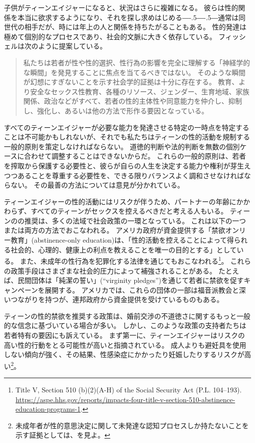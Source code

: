 \documentclass[paper=a4,book,openany]{jlreq}
\def\DDASH{―\kern-.5\zw―\kern-.5\zw―}
\begin{document}
子供がティーンエイジャーになると、状況はさらに複雑になる。
彼らは性的関係を本当に欲求するようになり、それを探し求めはじめる{\DDASH}通常は同世代の相手だが、時には年上の人と関係を持ちたがることもある。
性的発達は極めて個別的なプロセスであり、社会的文脈に大きく依存している。
フィッシェルは次のように提案している。

\begin{quote}
私たちは若者が性や性的選択、性行為の影響を完全に理解する「神経学的な瞬間」を発見することに焦点を当てるべきではない。
そのような瞬間が幻想にすぎないことを示す社会学的証拠は十分に存在する。
教育、より安全なセックス性教育、各種のリソース、ジェンダー、生育地域、家族関係、政治などがすべて、若者の性的主体性や同意能力を仲介し、抑制し、強化し、あるいは他の方法で形作る要因となっている。
\citep[p.305]{fischel10:_per_se_power}
\end{quote}

すべてのティーンエイジャーが必要な能力を発達させる特定の一時点を特定することは不可能かもしれないが、それでも私たちはティーンの性的活動を規制する一般的原則を策定しなければならない。
道徳的判断や法的判断を無数の個別ケースに合わせて調整することはできないからだ。
これらの一般的原則は、若者を搾取から保護する必要性と、彼らが自らの人生を決定する能力や権利が芽生えつつあることを尊重する必要性を、できる限りバランスよく調和させなければならない。
その最善の方法については意見が分かれている。

ティーンエイジャーの性的活動にはリスクが伴うため、パートナーの年齢にかかわらず、すべてのティーンがセックスを控えるべきだと考える人もいる。
ティーンのの推奨は、多くの法域で社会政策の一環となっている。
これは以下の一つまたは両方の方法でおこなわれる。
アメリカ政府が資金提供する「禁欲オンリー教育」(abstinence-only education)は、「性的活動を控えることによって得られる社会的、心理的、健康上の利点を教えることを唯一の目的とする」としている。
また、未成年の性行為を犯罪化する法律を通じてもおこなわれる\footnote{Title V, Section 510 (b)(2)(A-H) of the Social Security Act (P.L. 104--193). \url{https://aspe.hhs.gov/reports/impacts-four-title-v-section-510-abstinence-education-programs-1}.}。
これらの政策手段はさまざまな社会的圧力によって補強されることがある。
たとえば、民間団体は「純潔の誓い」(``virginity pledges'')を通じて若者に禁欲を促すキャンペーンを展開する。
アメリカでは、これらの団体の一部は福音派教会と深いつながりを持つが、連邦政府から資金提供を受けているものもある。

ティーンの性的禁欲を推奨する政策は、婚前交渉の不道徳さに関するもっと一般的な信念に基づいている場合が多い。
しかし、このような政策の支持者たちは若者特有の要因にも訴えている。
まず第一に、ティーンエイジャーはリスクの高い性的行動をとる可能性が高いと指摘されている。
成人よりも避妊具を使用しない傾向が強く、その結果、性感染症にかかったり妊娠したりするリスクが高い\footnote{未成年者が性的意思決定に関して未発達な認知プロセスしか持たないことを示す証拠としては、\citet{drobac14:_neurob_decis_makin_high_risk}を見よ。
}。
\end{document}
